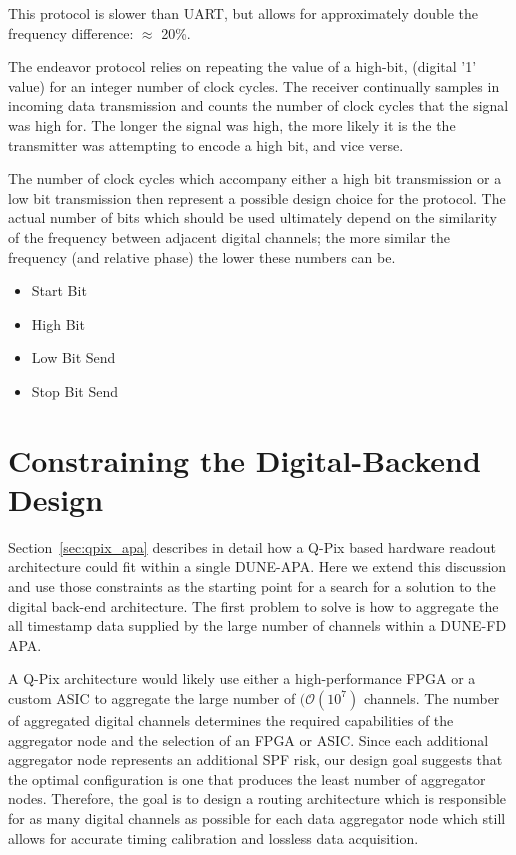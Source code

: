 This protocol is slower than UART, but allows for approximately double the frequency difference: $\approx$ 20\%.

The endeavor protocol relies on repeating the value of a high-bit, (digital '1' value) for an integer number of clock cycles.
The receiver continually samples in incoming data transmission and counts the number of clock cycles that the signal was high for.
The longer the signal was high, the more likely it is the the transmitter was attempting to encode a high bit, and vice verse.

The number of clock cycles which accompany either a high bit transmission or a low bit transmission then represent a possible design choice for the protocol.
The actual number of bits which should be used ultimately depend on the similarity of the frequency between adjacent digital channels; the more similar the frequency (and relative phase) the lower these numbers can be.

\begin{itemize}
    \item Start Bit
    \item High Bit
    \item Low Bit Send
    \item Stop Bit Send
\end{itemize}\label{item:endeavor}

\section{Constraining the Digital-Backend Design}

Section~\ref{sec:qpix_apa} describes in detail how a Q-Pix based hardware readout architecture could fit within a single DUNE-APA.
Here we extend this discussion and use those constraints as the starting point for a search for a solution to the digital back-end architecture.
The first problem to solve is how to aggregate the all timestamp data supplied by the large number of channels within a DUNE-FD APA.

A Q-Pix architecture would likely use either a high-performance FPGA or a custom ASIC to aggregate the large number of $(\mathcal{O}(10^{7})$ channels.
The number of aggregated digital channels determines the required capabilities of the aggregator node and the selection of an FPGA or ASIC.
Since each additional aggregator node represents an additional SPF risk, our design goal suggests that the optimal configuration is one that produces the least number of aggregator nodes.
Therefore, the goal is to design a routing architecture which is responsible for as many digital channels as possible for each data aggregator node which still allows for accurate timing calibration and lossless data acquisition.

